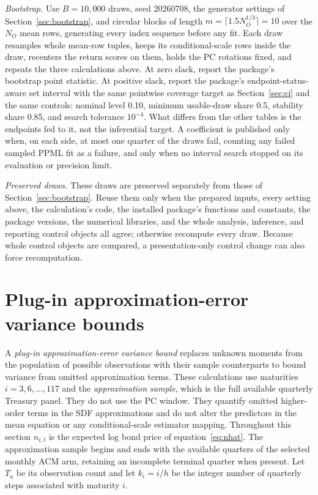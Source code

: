 \documentclass[11pt]{article}
\begin{document}
\emph{Bootstrap.} Use \(B=10{,}000\) draws, seed 20260708, the generator settings of
Section~\ref{sec:bootstrap}, and circular blocks of length
\(m=\lceil1.5N_O^{1/3}\rceil=10\) over the \(N_O\) mean rows, generating every index sequence
before any fit. Each draw resamples whole mean-row tuples, keeps its conditional-scale rows inside
the draw, recenters the return scores on them, holds the PC rotations fixed, and repeats the three
calculations above. At zero slack, report the package's bootstrap point statistic. At positive
slack, report the package's endpoint-status-aware set interval with the same pointwise coverage
target as Section~\ref{sec:ci} and the same controls: nominal level 0.10, minimum usable-draw share
0.5, stability share 0.85, and search tolerance \(10^{-4}\). What differs from the other tables is
the endpoints fed to it, not the inferential target. A coefficient is published only when, on each side, at most one quarter of the draws
fail, counting any failed sampled PPML fit as a failure, and only when no interval search stopped on
its evaluation or precision limit.

\emph{Preserved draws.} These draws are preserved separately from those of
Section~\ref{sec:bootstrap}. Reuse them only when the prepared inputs, every setting above, the
calculation's code, the installed package's functions and constants, the package versions, the
numerical libraries, and the whole analysis, inference, and reporting control objects all agree;
otherwise recompute every draw. Because whole control objects are compared, a presentation-only
control change can also force recomputation.

\section{Plug-in approximation-error variance bounds}
\label{sec:approximation}

A \emph{plug-in approximation-error variance bound} replaces unknown moments from the population
of possible observations with their sample counterparts to bound variance from omitted approximation terms.
These calculations use maturities \(i=3,6,\ldots,117\) and the \emph{approximation sample}, which is
the full available quarterly Treasury panel. They do not use the PC
window. They quantify omitted higher-order terms in the SDF approximations and do not
alter the predictors in the mean equation or any conditional-scale estimator mapping. Throughout this
section \(n_{i,t}\) is the expected log bond price of equation~\eqref{eq:nhat}. The approximation
sample begins and ends with the available quarters of the selected monthly ACM arm, retaining an
incomplete terminal quarter when present. Let \(T_a\) be its observation count and let \(k_i=i/h\) be
the integer number of quarterly steps associated with maturity \(i\).
\end{document}

